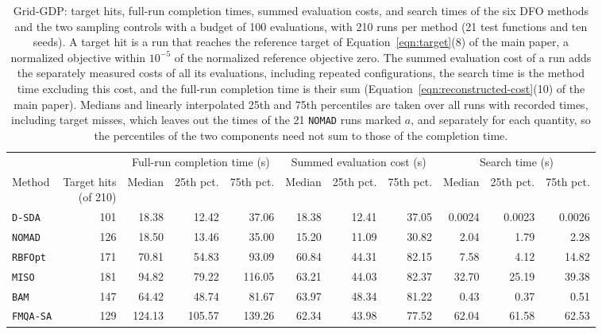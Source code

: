 \begin{table}[htbp]
\centering
\caption{Grid-GDP: target hits, full-run completion times, summed evaluation costs, and search times of the six DFO methods and the two sampling controls with a budget of 100 evaluations, with 210 runs per method (21 test functions and ten seeds).
A target hit is a run that reaches the reference target of Equation~\ifdefined\manuscriptwithsupplement\eqref{eqn:target}\else(8)\fi{} of the main paper, a normalized objective within \(10^{-5}\) of the normalized reference objective zero.
The summed evaluation cost of a run adds the separately measured costs of all its evaluations, including repeated configurations, the search time is the method time excluding this cost, and the full-run completion time is their sum (Equation~\ifdefined\manuscriptwithsupplement\eqref{eqn:reconstructed-cost}\else(10)\fi{} of the main paper).
Medians and linearly interpolated 25th and 75th percentiles are taken over all runs with recorded times, including target misses, which leaves out the times of the 21 \texttt{NOMAD} runs marked \(a\), and separately for each quantity, so the percentiles of the two components need not sum to those of the completion time.}
\label{tab:grid-cost}
\footnotesize
\setlength{\tabcolsep}{3.5pt}
\begin{threeparttable}
\begin{tabular}{@{}lrrrrrrrrrr@{}}\toprule
 & & \multicolumn{3}{c}{Full-run completion time (s)} & \multicolumn{3}{c}{Summed evaluation cost (s)} & \multicolumn{3}{c}{Search time (s)}\\\cmidrule(lr){3-5}\cmidrule(lr){6-8}\cmidrule(l){9-11}
Method & \makecell{Target hits\\(of 210)} & Median & 25th pct. & 75th pct. & Median & 25th pct. & 75th pct. & Median & 25th pct. & 75th pct.\\\midrule
\texttt{D-SDA} & 101 & 18.38 & 12.42 & 37.06 & 18.38 & 12.41 & 37.05 & 0.0024 & 0.0023 & 0.0026 \\
\texttt{NOMAD}\tnote{a} & 126 & 18.50 & 13.46 & 35.00 & 15.20 & 11.09 & 30.82 & 2.04 & 1.79 & 2.28 \\
\texttt{RBFOpt} & 171 & 70.81 & 54.83 & 93.09 & 60.84 & 44.31 & 82.15 & 7.58 & 4.12 & 14.82 \\
\texttt{MISO} & 181 & 94.82 & 79.22 & 116.05 & 63.21 & 44.03 & 82.37 & 32.70 & 25.19 & 39.38 \\
\texttt{BAM} & 147 & 64.42 & 48.74 & 81.67 & 63.97 & 48.34 & 81.22 & 0.43 & 0.37 & 0.51 \\
\texttt{FMQA-SA} & 129 & 124.13 & 105.57 & 139.26 & 62.34 & 43.98 & 77.52 & 62.04 & 61.58 & 62.53 \\

\end{tabular}
\end{threeparttable}
\end{table}
